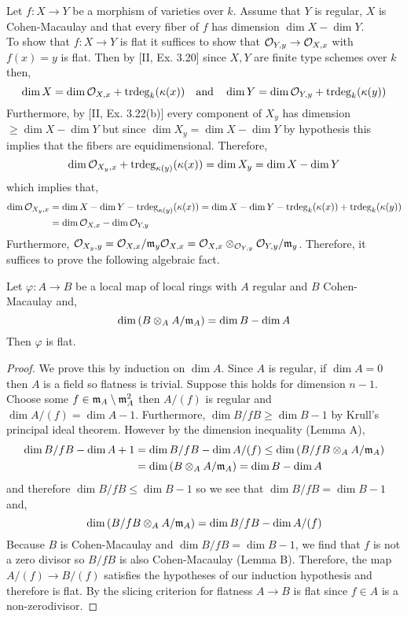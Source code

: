 \documentclass[12pt]{article}
\begin{document}
Let $f : X \to Y$ be a morphism of varieties over $k$. Assume that $Y$ is regular, $X$ is Cohen-Macaulay and that every fiber of $f$ has dimension $\dim{X} - \dim{Y}$.
\bigskip\\
To show that $f : X \to Y$ is flat it suffices to show that $\mathcal{O}_{Y, y} \to \mathcal{O}_{X, x}$ with $f(x) = y$ is flat. Then by [II, Ex. 3.20] since $X,Y$ are finite type schemes over $k$ then,
 \[ \dim{X} = \dim{\mathcal{O}_{X, x}} + \mathrm{trdeg}_{k}(\kappa(x)) \quad \text{and} \quad \dim{Y} = \dim{\mathcal{O}_{Y, y}} + \mathrm{trdeg}_{k}(\kappa(y)) \] 
Furthermore, by [II, Ex. 3.22(b)] every component of $X_y$ has dimension $\ge \dim{X} - \dim{Y}$ but since $\dim{X_y} = \dim{X} - \dim{Y}$ by hypothesis this implies that the fibers are equidimensional. Therefore, 
\[ \dim{\mathcal{O}_{X_y, x}} + \mathrm{trdeg}_{\kappa(y)}(\kappa(x)) = \dim{X_y} = \dim{X} - \dim{Y} \]
which implies that,
\begin{align*}
\dim{\mathcal{O}_{X_y, x}} & = \dim{X} - \dim{Y} - \mathrm{trdeg}_{\kappa(y)}(\kappa(x)) = \dim{X} - \dim{Y} - \mathrm{trdeg}_{k}(\kappa(x))  + \mathrm{trdeg}_{k}(\kappa(y)) 
\\
& = \dim{\mathcal{O}_{X, x}} - \dim{\mathcal{O}_{Y, y}}
\end{align*}
Furthermore, $\mathcal{O}_{X_y, y} = \mathcal{O}_{X, x} / \mathfrak{m}_y \mathcal{O}_{X, x} = \mathcal{O}_{X, x} \otimes_{\mathcal{O}_{Y, y}} \mathcal{O}_{Y, y} / \mathfrak{m}_y$.
Therefore, it suffices to prove the following algebraic fact.

\begin{prop}
Let $\varphi : A \to B$ be a local map of local rings with $A$ regular and $B$ Cohen-Macaulay and,
\[ \dim{(B \otimes_A A / \mathfrak{m}_A)} = \dim{B} - \dim{A} \]
Then $\varphi$ is flat.
\end{prop}

\begin{proof}
We prove this by induction on $\dim{A}$. Since $A$ is regular, if $\dim{A} = 0$ then $A$ is a field so flatness is trivial. Suppose this holds for dimension $n-1$. Choose some $f \in \mathfrak{m}_A \setminus \mathfrak{m}_A^2$ then $A / (f)$ is regular and $\dim{A/(f)} = \dim{A} - 1$. Furthermore, $\dim{B/ fB} \ge \dim{B} - 1$ by Krull's principal ideal theorem. However by the dimension inequality (Lemma A), 
\begin{align*}
\dim{B/fB} - \dim{A} + 1 & = \dim{B/fB} - \dim{A/(f)} \le \dim{(B/fB \otimes_A A/\mathfrak{m}_A)}
\\
& = \dim{(B \otimes_A A/\mathfrak{m}_A)} = \dim{B} - \dim{A} 
\end{align*}
and therefore $\dim{B/fB} \le \dim{B} - 1$ so we see that $\dim{B/fB} = \dim{B} - 1$ and,
\[ \dim{(B/fB \otimes_A A/\mathfrak{m}_A)} = \dim{B/fB} - \dim{A/(f)} \]
Because $B$ is Cohen-Macaulay and $\dim{B/fB} = \dim{B} - 1$, we find that $f$ is not a zero divisor so $B/fB$ is also Cohen-Macaulay (Lemma B). Therefore, the map $A/(f) \to B/(f)$ satisfies the hypotheses of our induction hypothesis and therefore is flat. By the slicing criterion for flatness $A \to B$ is flat since $f \in A$ is a non-zerodivisor.
\end{proof}
\end{document}

